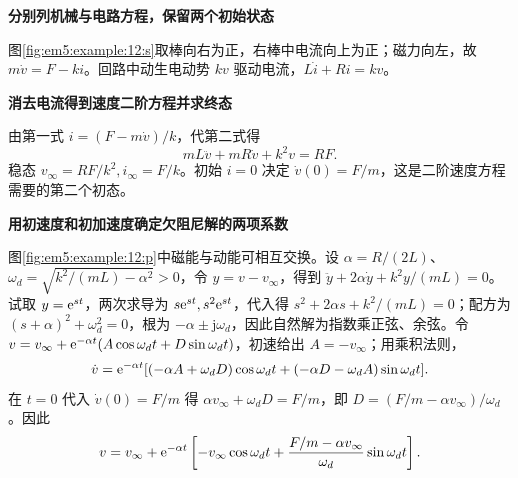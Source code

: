 \begin{solution}\textbf{分别列机械与电路方程，保留两个初始状态}\par\nobreak
图\ref{fig:em5:example:12:s}取棒向右为正，右棒中电流向上为正；磁力向左，故 $m\dot v=F-ki$。回路中动生电动势 $kv$ 驱动电流，$L\dot i+Ri=kv$。

\par\medskip{}\noindent\textbf{消去电流得到速度二阶方程并求终态}\par\nobreak
由第一式 $i=(F-m\dot v)/k$，代第二式得
\[mL\ddot v+mR\dot v+k^2v=RF.\]
稳态 $v_\infty=RF/k^2,i_\infty=F/k$。初始 $i=0$ 决定 $\dot v(0)=F/m$，这是二阶速度方程需要的第二个初态。



\par\medskip{}\noindent\textbf{用初速度和初加速度确定欠阻尼解的两项系数}\par\nobreak
图\ref{fig:em5:example:12:p}中磁能与动能可相互交换。设 $\alpha=R/(2L)$、$\omega_d=\sqrt{k^2/(mL)-\alpha^2}>0$，令 $y=v-v_\infty$，得到 $\ddot y+2\alpha\dot y+k^2y/(mL)=0$。试取 $y=\mathrm e^{st}$，两次求导为 $s\mathrm e^{st},s^2\mathrm e^{st}$，代入得 $s^2+2\alpha s+k^2/(mL)=0$；配方为 $(s+\alpha)^2+\omega_d^2=0$，根为 $-\alpha\pm\mathrm j\omega_d$，因此自然解为指数乘正弦、余弦。令 $v=v_\infty+\mathrm e^{-\alpha t}(A\cos\omega_dt+D\sin\omega_dt)$，初速给出 $A=-v_\infty$；用乘积法则，
\[
\dot v=\mathrm e^{-\alpha t}
[(-\alpha A+\omega_dD)\cos\omega_dt
+(-\alpha D-\omega_dA)\sin\omega_dt].
\]
在 $t=0$ 代入 $\dot v(0)=F/m$ 得
$\alpha v_\infty+\omega_dD=F/m$，即 $D=(F/m-\alpha v_\infty)/\omega_d$。因此
\[v=v_\infty+\mathrm e^{-\alpha t}\left[-v_\infty\cos\omega_dt+\frac{F/m-\alpha v_\infty}{\omega_d}\sin\omega_dt\right].\]




\end{solution}
